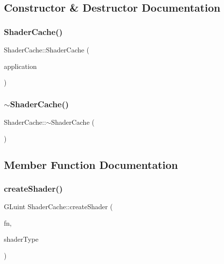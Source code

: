 \subsection{Constructor \& Destructor Documentation}
\mbox{\label{classsage_1_1ShaderCache_a0e06bd6fc1ffcc7129e13c8a3ae06aef}} 
\subsubsection{\texorpdfstring{ShaderCache()}{ShaderCache()}}
{\footnotesize\ttfamily Shader\+Cache\+::\+Shader\+Cache (\begin{DoxyParamCaption}\item[{\mbox{\hyperlink{classsage_1_1Application}{Application}} \&}]{application }\end{DoxyParamCaption})}

\mbox{\label{classsage_1_1ShaderCache_a060caa88a1718dddc0800aa552ac4a41}} 
\subsubsection{\texorpdfstring{$\sim$ShaderCache()}{~ShaderCache()}}
{\footnotesize\ttfamily Shader\+Cache\+::$\sim$\+Shader\+Cache (\begin{DoxyParamCaption}{ }\end{DoxyParamCaption})}



\subsection{Member Function Documentation}
\mbox{\label{classsage_1_1ShaderCache_a6faed61c708a429ddb246855707c8596}} 
\subsubsection{\texorpdfstring{createShader()}{createShader()}}
{\footnotesize\ttfamily G\+Luint Shader\+Cache\+::create\+Shader (\begin{DoxyParamCaption}\item[{const std\+::string \&}]{fn,  }\item[{G\+Lenum}]{shader\+Type }\end{DoxyParamCaption})\hspace{0.3cm}{\ttfamily [private]}}

